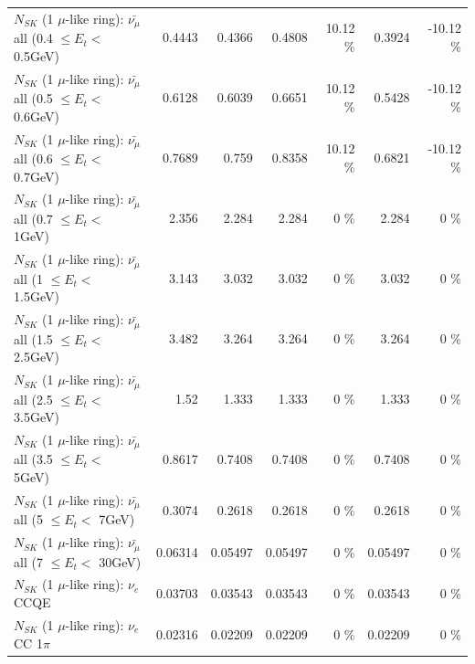 \begin{table}
\begin{tabular}{| l | r | r | r  r | r  r |}
 $N_{SK}$ (1 $\mu$-like ring): $\bar{\nu_{\mu}}$ all (0.4 $\leq E_{t} <$ 0.5GeV) &          0.4443 &          0.4366 &          0.4808 &    10.12 \%  &          0.3924 &   -10.12 \%  \\ 
 $N_{SK}$ (1 $\mu$-like ring): $\bar{\nu_{\mu}}$ all (0.5 $\leq E_{t} <$ 0.6GeV) &          0.6128 &          0.6039 &          0.6651 &    10.12 \%  &          0.5428 &   -10.12 \%  \\ 
 $N_{SK}$ (1 $\mu$-like ring): $\bar{\nu_{\mu}}$ all (0.6 $\leq E_{t} <$ 0.7GeV) &          0.7689 &           0.759 &          0.8358 &    10.12 \%  &          0.6821 &   -10.12 \%  \\ 
   $N_{SK}$ (1 $\mu$-like ring): $\bar{\nu_{\mu}}$ all (0.7 $\leq E_{t} <$ 1GeV) &           2.356 &           2.284 &           2.284 &        0 \%  &           2.284 &        0 \%  \\ 
   $N_{SK}$ (1 $\mu$-like ring): $\bar{\nu_{\mu}}$ all (1 $\leq E_{t} <$ 1.5GeV) &           3.143 &           3.032 &           3.032 &        0 \%  &           3.032 &        0 \%  \\ 
 $N_{SK}$ (1 $\mu$-like ring): $\bar{\nu_{\mu}}$ all (1.5 $\leq E_{t} <$ 2.5GeV) &           3.482 &           3.264 &           3.264 &        0 \%  &           3.264 &        0 \%  \\ 
 $N_{SK}$ (1 $\mu$-like ring): $\bar{\nu_{\mu}}$ all (2.5 $\leq E_{t} <$ 3.5GeV) &            1.52 &           1.333 &           1.333 &        0 \%  &           1.333 &        0 \%  \\ 
   $N_{SK}$ (1 $\mu$-like ring): $\bar{\nu_{\mu}}$ all (3.5 $\leq E_{t} <$ 5GeV) &          0.8617 &          0.7408 &          0.7408 &        0 \%  &          0.7408 &        0 \%  \\ 
     $N_{SK}$ (1 $\mu$-like ring): $\bar{\nu_{\mu}}$ all (5 $\leq E_{t} <$ 7GeV) &          0.3074 &          0.2618 &          0.2618 &        0 \%  &          0.2618 &        0 \%  \\ 
    $N_{SK}$ (1 $\mu$-like ring): $\bar{\nu_{\mu}}$ all (7 $\leq E_{t} <$ 30GeV) &         0.06314 &         0.05497 &         0.05497 &        0 \%  &         0.05497 &        0 \%  \\ 
\hline
\hline
\hline
                                      $N_{SK}$ (1 $\mu$-like ring): $\nu_e$ CCQE &         0.03703 &         0.03543 &         0.03543 &        0 \%  &         0.03543 &        0 \%  \\ 
                                 $N_{SK}$ (1 $\mu$-like ring): $\nu_e$ CC 1$\pi$ &         0.02316 &         0.02209 &         0.02209 &        0 \%  &         0.02209 &        0 \%  \\ 

\end{tabular}
\end{table}
